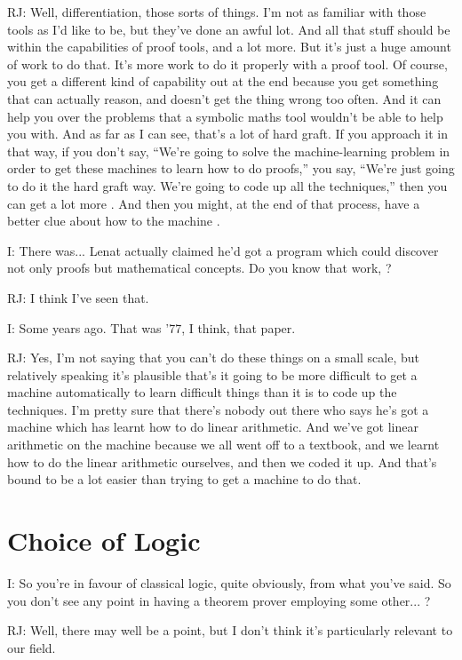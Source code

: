\documentclass[10pt,titlepage]{book}
\begin{document}
RJ: Well, differentiation, those sorts of things.
I'm not as familiar with those tools as I'd like to be, but they've done an awful lot.
And all that stuff should be within the capabilities of proof tools, and a lot more. But it's just a huge amount of work to do that. It's more work to do it properly with a proof tool. Of course, you get a different kind of capability out at the end because you get something that can actually reason, and doesn't get the thing wrong too often. And it can help you over the problems that a symbolic maths tool wouldn't be able to help you with. And as far as I can see, that's a lot of hard graft. If you approach it in that way, if you don't say, ``We're going to solve the machine-learning problem in order to get these machines to learn how to do proofs,'' you say, ``We're just going to do it the hard graft way. We're going to code up all the techniques,'' then you can get a lot more 	. And then you might, at the end of that process, have a better clue about how to 	the machine	.

I: There was... Lenat actually claimed he'd got a program which could discover not only proofs but mathematical concepts.
Do you know that work,	?

RJ: I think I've seen that.

I: Some years ago.
That was '77, I think, that paper.

RJ: Yes, I'm not saying that you can't do these things on a small scale, but relatively speaking it's plausible that's it going to be more difficult to get a machine automatically to learn difficult things than it is to code up the techniques.
I'm pretty sure that there's nobody out there who says he's got a machine which has learnt how to do linear arithmetic.
And we've got linear arithmetic on the machine because we all went off to a textbook, and we learnt how to do the linear arithmetic ourselves, and then we coded it up.
And that's bound to be a lot easier than trying to get a machine to do that.

\section{Choice of Logic}

I: So you're in favour of classical logic, quite obviously, from what you've said.
So you don't see any point in having a theorem prover employing some other... ?

RJ: Well, there may well be a point, but I don't think it's particularly relevant to our field.
\end{document}
